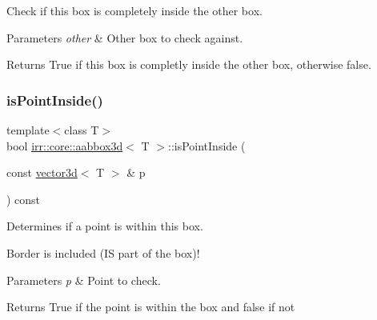 Check if this box is completely inside the \textquotesingle{}other\textquotesingle{} box. 


\begin{DoxyParams}{Parameters}
{\em other} & Other box to check against. \\
\hline
\end{DoxyParams}
\begin{DoxyReturn}{Returns}
True if this box is completly inside the other box, otherwise false. 
\end{DoxyReturn}
\mbox{\label{classirr_1_1core_1_1aabbox3d_ae69d28e1e512f705a6cbf95c5829f6cd}} 
\subsubsection{\texorpdfstring{is\+Point\+Inside()}{isPointInside()}\hspace{0.1cm}{\footnotesize\ttfamily [1/2]}}
{\footnotesize\ttfamily template$<$class T$>$ \\
bool \hyperlink{classirr_1_1core_1_1aabbox3d}{irr\+::core\+::aabbox3d}$<$ T $>$\+::is\+Point\+Inside (\begin{DoxyParamCaption}\item[{const \hyperlink{classirr_1_1core_1_1vector3d}{vector3d}$<$ T $>$ \&}]{p }\end{DoxyParamCaption}) const\hspace{0.3cm}{\ttfamily [inline]}}



Determines if a point is within this box. 

Border is included (IS part of the box)! 
\begin{DoxyParams}{Parameters}
{\em p} & Point to check. \\
\hline
\end{DoxyParams}
\begin{DoxyReturn}{Returns}
True if the point is within the box and false if not 
\end{DoxyReturn}
\mbox{\label{classirr_1_1core_1_1aabbox3d_ae69d28e1e512f705a6cbf95c5829f6cd}} 
